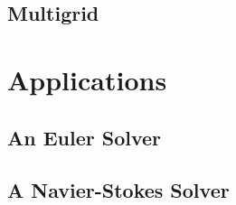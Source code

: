 \section{Multigrid}

\chapter{Applications}
\section{An Euler Solver}

\section{A Navier-Stokes Solver}